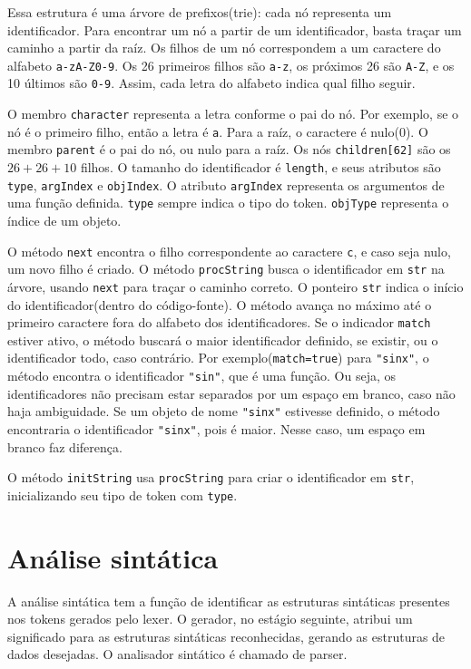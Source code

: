 Essa estrutura é uma árvore de prefixos(trie):
cada nó representa um identificador. Para encontrar um nó a partir
de um identificador, basta traçar um caminho a partir da raíz.
Os filhos de um nó correspondem a um caractere do alfabeto \texttt{a-zA-Z0-9}.
Os 26 primeiros filhos são \texttt{a-z}, os próximos 26 são \texttt{A-Z},
e os 10 últimos são \texttt{0-9}.
Assim, cada letra do alfabeto indica qual filho seguir.

O membro \texttt{character} representa a letra conforme o pai do nó.
Por exemplo, se o nó é o primeiro filho, então a letra é \texttt{a}.
Para a raíz, o caractere é nulo(0).
O membro \texttt{parent} é o pai do nó, ou nulo para a raíz.
Os nós \texttt{children[62]} são os $26+26+10$ filhos.
O tamanho do identificador é \texttt{length}, e seus atributos são
\texttt{type}, \texttt{argIndex} e \texttt{objIndex}.
O atributo \texttt{argIndex} representa os argumentos de uma função definida.
\texttt{type} sempre indica o tipo do token.
\texttt{objType} representa o índice de um objeto.

O método \texttt{next} encontra o filho correspondente ao caractere \texttt{c},
e caso seja nulo, um novo filho é criado.
O método \texttt{procString} busca o identificador em \texttt{str} na árvore,
usando \texttt{next} para traçar o caminho correto.
O ponteiro \texttt{str} indica o início do identificador(dentro do código-fonte).
O método avança no máximo até o primeiro caractere fora do alfabeto
dos identificadores.
Se o indicador \texttt{match} estiver ativo, o método buscará o
maior identificador definido, se existir, ou o identificador todo, caso contrário.
Por exemplo(\texttt{match=true}) para \texttt{"sinx"},
o método encontra o identificador \texttt{"sin"}, que é uma função.
Ou seja, os identificadores não precisam estar separados por um espaço em branco,
caso não haja ambiguidade.
Se um objeto de nome \texttt{"sinx"} estivesse definido,
o método encontraria o identificador \texttt{"sinx"}, pois é maior.
Nesse caso, um espaço em branco faz diferença.

O método \texttt{initString} usa \texttt{procString}
para criar o identificador em \texttt{str},
inicializando seu tipo de token com \texttt{type}.

\section{Análise sintática}
A análise sintática tem a função de identificar as estruturas sintáticas
presentes nos tokens gerados pelo lexer.
O gerador, no estágio seguinte, atribui um significado para as estruturas
sintáticas reconhecidas, gerando as estruturas de dados desejadas.
O analisador sintático é chamado de parser.


